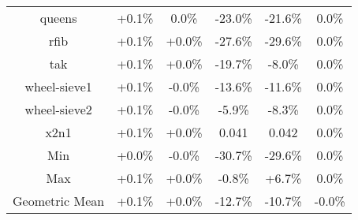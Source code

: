\begin{tabular}{ c c c c c c }
queens & +0.1\% &  0.0\% & -23.0\% & -21.6\% &  0.0\%\\
rfib & +0.1\% & +0.0\% & -27.6\% & -29.6\% &  0.0\%\\
tak & +0.1\% & +0.0\% & -19.7\% & -8.0\% &  0.0\%\\
wheel-sieve1 & +0.1\% & -0.0\% & -13.6\% & -11.6\% &  0.0\%\\
wheel-sieve2 & +0.1\% & -0.0\% & -5.9\% & -8.3\% &  0.0\%\\
x2n1 & +0.1\% & +0.0\% & 0.041 & 0.042 &  0.0\%\\
\hline
Min & +0.0\% & -0.0\% & -30.7\% & -29.6\% &  0.0\%\\
Max & +0.1\% & +0.0\% & -0.8\% & +6.7\% &  0.0\%\\
Geometric Mean & +0.1\% & +0.0\% & -12.7\% & -10.7\% & -0.0\%\\


\end{tabular}
